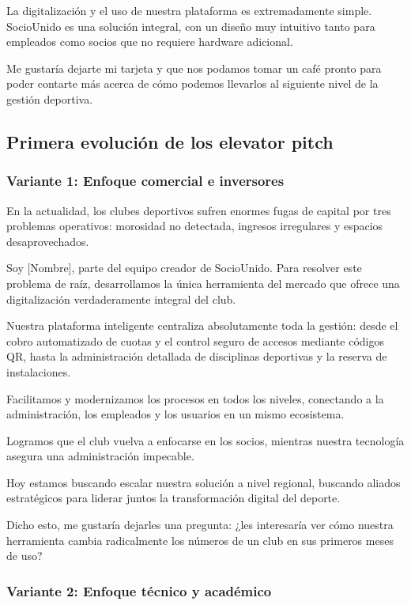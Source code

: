 La digitalización y el uso de nuestra plataforma es extremadamente simple. SocioUnido es una solución integral, con un diseño muy intuitivo tanto para empleados como socios que no requiere hardware adicional.

Me gustaría dejarte mi tarjeta y que nos podamos tomar un café pronto para poder contarte más acerca de cómo podemos llevarlos al siguiente nivel de la gestión deportiva.

\subsection{Primera evolución de los elevator pitch}

\subsubsection{Variante 1: Enfoque comercial e inversores}

En la actualidad, los clubes deportivos sufren enormes fugas de capital por tres problemas operativos: morosidad no detectada, ingresos irregulares y espacios desaprovechados.

Soy [Nombre], parte del equipo creador de SocioUnido. Para resolver este problema de raíz, desarrollamos la única herramienta del mercado que ofrece una digitalización verdaderamente integral del club.

Nuestra plataforma inteligente centraliza absolutamente toda la gestión: desde el cobro automatizado de cuotas y el control seguro de accesos mediante códigos QR, hasta la administración detallada de disciplinas deportivas y la reserva de instalaciones.

Facilitamos y modernizamos los procesos en todos los niveles, conectando a la administración, los empleados y los usuarios en un mismo ecosistema.

Logramos que el club vuelva a enfocarse en los socios, mientras nuestra tecnología asegura una administración impecable.

Hoy estamos buscando escalar nuestra solución a nivel regional, buscando aliados estratégicos para liderar juntos la transformación digital del deporte.

Dicho esto, me gustaría dejarles una pregunta: ¿les interesaría ver cómo nuestra herramienta cambia radicalmente los números de un club en sus primeros meses de uso?

\newpage

\subsubsection{Variante 2: Enfoque técnico y académico}

